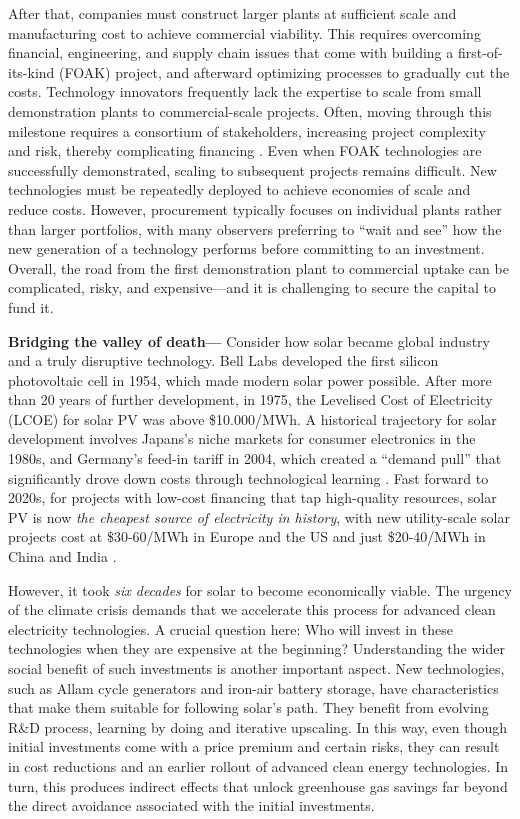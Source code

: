 \documentclass[pdflatex,sn-basic, Numbered]{sn-jnl}%
\theoremstyle{thmstyleone}%
\theoremstyle{thmstyletwo}%
\theoremstyle{thmstylethree}%
\begin{document}
After that, companies must construct larger plants at sufficient scale and manufacturing cost to achieve commercial viability. This requires overcoming financial, engineering, and supply chain issues that come with building a first-of-its-kind (FOAK) project, and afterward optimizing processes to gradually cut the costs. Technology innovators frequently lack the expertise to scale from small demonstration plants to commercial-scale projects. Often, moving through this milestone requires a consortium of stakeholders, increasing project complexity and risk, thereby complicating financing \cite{google-advancedtech}.
Even when FOAK technologies are successfully demonstrated, scaling to subsequent projects remains difficult. New technologies must be repeatedly deployed to achieve economies of scale and reduce costs. However, procurement typically focuses on individual plants rather than larger portfolios, with many observers preferring to \enquote{wait and see} how the new generation of a technology performs before committing to an investment. Overall, the road from the first demonstration plant to commercial uptake can be complicated, risky, and expensive---and it is challenging to secure the capital to fund it.

\textbf{Bridging the valley of death---} Consider how solar became global industry and a truly disruptive technology. Bell Labs developed the first silicon photovoltaic cell in 1954, which made modern solar power possible. After more than 20 years of further development, in 1975, the Levelised Cost of Electricity (LCOE) for solar PV was above \$10.000/MWh. A historical trajectory for solar development involves Japans's niche markets for consumer electronics in the 1980s, and Germany's feed-in tariff in 2004, which created a \enquote{demand pull} that significantly drove down costs through technological learning \cite{nemetHowSolarEnergy2019}. Fast forward to 2020s, for projects with low-cost financing that tap high-quality resources, solar PV is now \textit{the cheapest source of electricity in history}, with new utility-scale solar projects cost at \$30-60/MWh in Europe and the US and just \$20-40/MWh in China and India \cite{WorldEnergyOutlook2020}.

However, it took \textit{six decades} for solar to become economically viable. The urgency of the climate crisis demands that we accelerate this process for advanced clean electricity technologies. A crucial question here: Who will invest in these technologies when they are expensive at the beginning? Understanding the wider social benefit of such investments is another important aspect.  New technologies, such as Allam cycle generators and iron-air battery storage, have characteristics that make them suitable for following solar's path. They benefit from evolving R\&D process, learning by doing and iterative upscaling. In this way, even though initial investments come with a price premium and certain risks, they can result in cost reductions and an earlier rollout of advanced clean energy technologies. In turn, this produces indirect effects that unlock greenhouse gas savings far beyond the direct avoidance associated with the initial investments.
\end{document}
